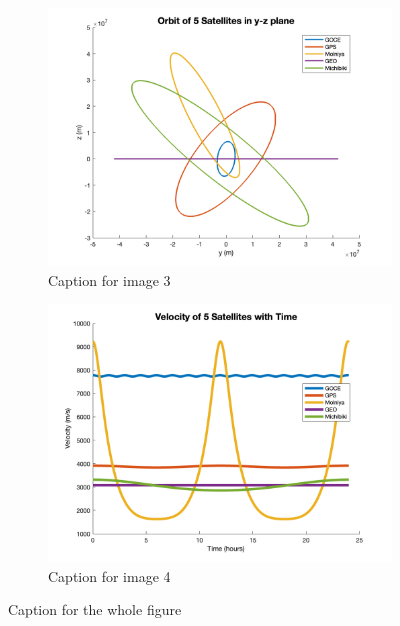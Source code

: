 \documentclass[12pt
,headinclude
,headsepline
,bibtotocnumbered
]{scrartcl}
\begin{document}
\begin{figure}[H]
\begin{subfigure}[b]{0.45\textwidth}
        \includegraphics[width=\textwidth]{plots/orbyz.png}
        \caption{Caption for image 3}
        \label{fig:image3}
    \end{subfigure}
    \begin{subfigure}[b]{0.45\textwidth}
        \includegraphics[width=\textwidth]{plots/velocity.png}
        \caption{Caption for image 4}
        \label{fig:image4}
    \end{subfigure}
    \caption{Caption for the whole figure}
    \label{fig:images}
\end{figure}
\end{document}

